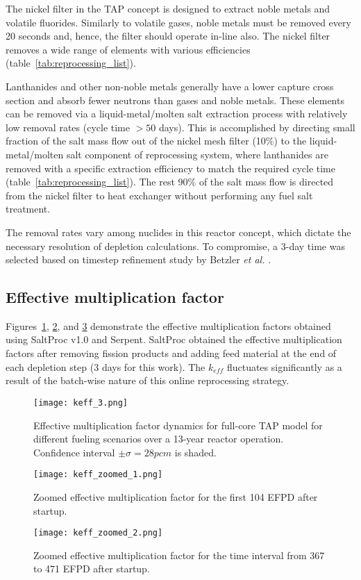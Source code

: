 The nickel filter in the \gls{TAP} concept is designed to extract noble metals 
and volatile fluorides. Similarly to volatile gases, noble metals must be 
removed every 20 seconds and, hence, the filter should operate in-line also. 
The nickel filter removes a wide range of elements with various efficiencies 
(table~\ref{tab:reprocessing_list}).

Lanthanides and other non-noble metals generally have a lower capture  
cross section and absorb fewer neutrons than gases and noble metals. These 
elements can be removed via a liquid-metal/molten salt extraction process with 
relatively low removal rates (cycle time $> 50$ days). This is accomplished 
by directing small fraction of the salt mass flow out of the nickel mesh 
filter (10\%) to the liquid-metal/molten salt component of reprocessing 
system, where lanthanides are removed with a specific extraction efficiency to 
match the  required cycle time (table~\ref{tab:reprocessing_list}). The rest 
90\% of the salt mass flow is directed from the nickel filter to heat 
exchanger without performing any fuel salt treatment.

The removal rates vary among nuclides in this reactor concept, which dictate 
the necessary resolution of depletion calculations. To compromise, a 3-day 
time was selected based on timestep refinement study by Betzler \emph{et al.} 
\cite{betzler_assessment_2017}.
\subsection{Effective multiplication factor}
Figures~\ref{fig:keff}, \ref{fig:keff-zoomed}, and \ref{fig:keff-zoomed-2} 
demonstrate the effective multiplication factors obtained using SaltProc v1.0 
and Serpent. SaltProc obtained the effective multiplication factors after 
removing fission products and adding feed material at the end of each 
depletion step (3 days for this work). The $k_{eff}$ fluctuates significantly 
as a result of the batch-wise nature of this online reprocessing strategy.
\begin{figure}[htp!] %
	\texttt{[image: keff\_3.png]}
	\vspace{-0.2in}
	\caption{Effective multiplication factor dynamics for full-core
		\gls{TAP} model for different fueling scenarios over a 13-year reactor 
		operation. 
		Confidence interval $\pm\sigma=28pcm$ is shaded.}
	\label{fig:keff}
\end{figure}
\begin{figure}[htp!] %
	\centering
	\texttt{[image: keff\_zoomed\_1.png]}
	\caption{Zoomed effective multiplication factor for the first 104 EFPD 
		after startup.}
	\label{fig:keff-zoomed}
\end{figure}
\begin{figure}[htp!] %
	\centering
	\texttt{[image: keff\_zoomed\_2.png]}
	\caption{Zoomed effective multiplication factor for the time interval 
		from 367 to 471 EFPD after startup.}
	\label{fig:keff-zoomed-2}
\end{figure}

